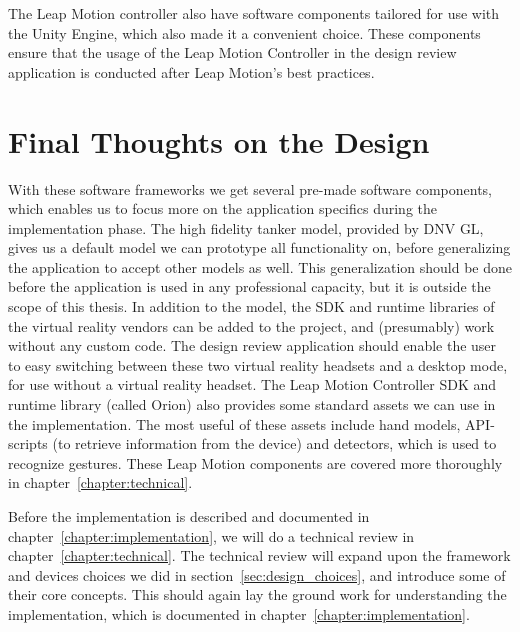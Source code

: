 The Leap Motion controller also have software components tailored for use with the Unity Engine, which also made it a convenient choice. 
These components ensure that the usage of the Leap Motion Controller in the design review application is conducted after Leap Motion's best practices. 

\section{Final Thoughts on the Design}
With these software frameworks we get several pre-made software components, which enables us to focus more on the application specifics during the implementation phase.
The high fidelity tanker model, provided by DNV GL, gives us a default model we can prototype all functionality on, before generalizing the application to accept other models as
well. This generalization should be done before the application is used in any professional capacity, but it is outside the scope of this thesis. 
In addition to the model, the SDK and runtime libraries of the virtual reality vendors can be added to the project, and (presumably) work without any custom code. 
The design review application should enable the user to easy switching between these two virtual reality headsets and a desktop mode, for use without a virtual reality headset.
The Leap Motion Controller SDK and runtime library (called Orion) also provides some standard assets we can use in the implementation. 
The most useful of these assets include hand models, API-scripts (to retrieve information from the device) and detectors, which is used to recognize gestures. 
These Leap Motion components are covered more thoroughly in chapter~\ref{chapter:technical}.

Before the implementation is described and documented in chapter~\ref{chapter:implementation}, we will do a technical review in chapter~\ref{chapter:technical}. 
The technical review will expand upon the framework and devices choices we did in section~\ref{sec:design_choices}, and introduce some of their core concepts. 
This should again lay the ground work for understanding the implementation, which is documented in chapter~\ref{chapter:implementation}.



